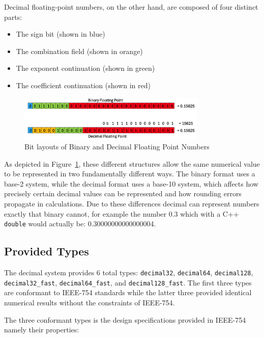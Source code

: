 \documentclass[acmsmall]{acmart}
\newcommand{\code}[1]{\texttt{#1}}
\begin{document}
Decimal floating-point numbers, on the other hand, are composed of four distinct parts:
\begin{itemize}
    \item The sign bit (shown in blue)
    \item The combination field (shown in orange)
    \item The exponent continuation (shown in green)
    \item The coefficient continuation (shown in red)
\end{itemize}

\begin{figure}[H]
    \centering
    \includegraphics[width=0.8\textwidth]{layout.png}
    \caption{Bit layouts of Binary and Decimal Floating Point Numbers}
    \label{fig:fp-layouts}
\end{figure}

As depicted in Figure~\ref{fig:fp-layouts}, these different structures allow the same numerical value to be represented in two fundamentally different ways. 
The binary format uses a base-2 system, while the decimal format uses a base-10 system, which affects how precisely certain decimal values can be represented and how rounding errors propagate in calculations.
Due to these differences decimal can represent numbers exactly that binary cannot, for example the number 0.3 which with a C++ \code{double} would actually be: 0.30000000000000004.

\subsection{Provided Types}

The decimal system provides 6 total types: \code{decimal32}, \code{decimal64}, \code{decimal128}, \code{decimal32\_fast}, \code{decimal64\_fast}, and \code{decimal128\_fast}.
The first three types are conformant to IEEE-754 standards while the latter three provided identical numerical results without the constraints of IEEE-754.

The three conformant types is  the design specifications provided in IEEE-754 namely their properties:
\end{document}
